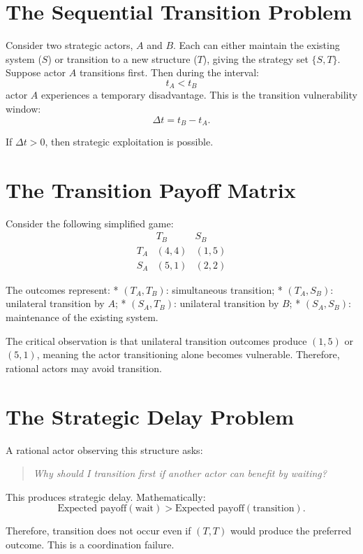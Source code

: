 \documentclass[11pt,openany]{book}
\theoremstyle{plain}
\theoremstyle{definition}
\begin{document}
\section*{The Sequential Transition Problem}

Consider two strategic actors, \(A\) and \(B\). Each can either maintain the existing system (\(S\)) or transition to a new structure (\(T\)), giving the strategy set \(\{S, T\}\). Suppose actor \(A\) transitions first. Then during the interval:
\[
t_A < t_B
\]
actor \(A\) experiences a temporary disadvantage. This is the transition vulnerability window:
\[
\Delta t = t_B - t_A.
\]

If \(\Delta t > 0\), then strategic exploitation is possible.

\section*{The Transition Payoff Matrix}

Consider the following simplified game:
\[
\begin{array}{c|cc}
& T_B & S_B \\
\hline
T_A & (4, 4) & (1, 5) \\
S_A & (5, 1) & (2, 2)
\end{array}
\]

The outcomes represent:
* \((T_A, T_B)\): simultaneous transition;
* \((T_A, S_B)\): unilateral transition by \(A\);
* \((S_A, T_B)\): unilateral transition by \(B\);
* \((S_A, S_B)\): maintenance of the existing system.

The critical observation is that unilateral transition outcomes produce \((1, 5)\) or \((5, 1)\), meaning the actor transitioning alone becomes vulnerable. Therefore, rational actors may avoid transition.

\section*{The Strategic Delay Problem}

A rational actor observing this structure asks:
\begin{quote}
\textit{Why should I transition first if another actor can benefit by waiting?}
\end{quote}

This produces strategic delay. Mathematically:
\[
\text{Expected payoff}(\text{wait}) > \text{Expected payoff}(\text{transition}).
\]

Therefore, transition does not occur even if \((T, T)\) would produce the preferred outcome. This is a coordination failure.
\end{document}
